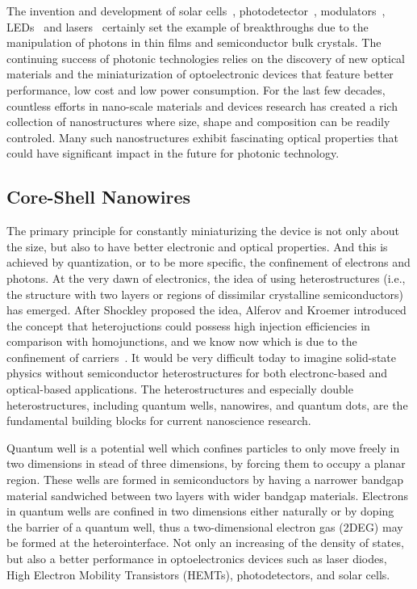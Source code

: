The invention and development of solar
cells~\cite{sun2005organic,perlin1999space},
photodetector~\cite{razeghi1996semiconductor,rogalski2002infrared},
modulators~\cite{chen2011broadband,schuller2010plasmonics},
LEDs~\cite{spanggaard2004brief,schubert2005solid,schubert2005light} and
lasers~\cite{chow2012semiconductor,yablonovitch1987inhibited} certainly set the
example of breakthroughs due to the manipulation of photons in thin films and
semiconductor bulk crystals. The continuing success of photonic technologies
relies on the discovery of new optical materials and the miniaturization of
optoelectronic devices that feature better performance, low cost and low power
consumption. For the last few decades, countless efforts in nano-scale
materials and devices research has created a rich collection of nanostructures
where size, shape and composition can be readily controled. Many such
nanostructures exhibit fascinating optical properties that could have
significant impact in the future for photonic technology. 

\subsection{Core-Shell Nanowires} \label{sec:intro_CSNW}

The primary principle for constantly miniaturizing the device is not only about
the size, but also to have better electronic and optical properties. And
this is achieved by quantization, or to be more specific, the confinement of
electrons and photons. At the very dawn of electronics, the idea of using
heterostructures (i.e., the structure with two layers or regions of dissimilar
crystalline semiconductors) has emerged. After Shockley proposed the idea,
Alferov and Kroemer introduced the concept that heterojuctions could possess
high injection efficiencies in comparison with homojunctions, and we know now
which is due to the confinement of carriers~\cite{alferov2000double}. It would be
very difficult today to imagine solid-state physics without semiconductor
heterostructures for both electronc-based and optical-based applications. The
heterostructures and especially double heterostructures, including quantum
wells, nanowires, and quantum dots, are the fundamental building blocks for
current nanoscience research.

Quantum well is a potential well which confines particles to only move freely
in two dimensions in stead of three dimensions, by forcing them to occupy a
planar region. These wells are formed in semiconductors by having a narrower
bandgap material sandwiched between two layers with wider bandgap materials.
Electrons in quantum wells are confined in two dimensions either naturally or
by doping the barrier of a quantum well, thus a two-dimensional electron gas
(2DEG) may be formed at the heterointerface. Not only an increasing of the
density of states, but also a better performance in optoelectronics devices such
as laser diodes, High Electron Mobility Transistors (HEMTs), photodetectors,
and solar cells.


